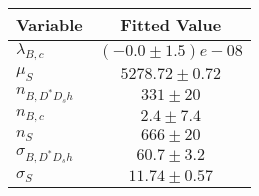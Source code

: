 \begin{tabular}[t]{lc}
\hline
Variable &Fitted Value\\
\hline\hline
$\lambda_{B,c}$&$(-0.0\pm1.5)e-08$\\
\hline
$\mu_S$&$5278.72\pm0.72$\\
\hline
$n_{B, D^* D_s h}$&$331\pm20$\\
\hline
$n_{B,c}$&$2.4\pm7.4$\\
\hline
$n_S$&$666\pm20$\\
\hline
$\sigma_{B, D^* D_s h}$&$60.7\pm3.2$\\
\hline
$\sigma_S$&$11.74\pm0.57$\\
\hline
\end{tabular}
